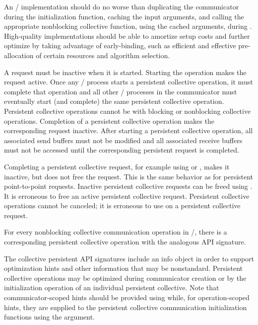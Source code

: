 \begin{implementors}
An \MPI/ implementation should do no worse than duplicating the communicator during the initialization function,
caching the input arguments, and
calling the appropriate nonblocking collective function, using the cached arguments, during .
High-quality implementations should be able to amortize setup costs and further optimize by taking advantage of early-binding,
such as efficient and effective pre-allocation of certain resources and algorithm selection.
\end{implementors}

A request must be inactive when it is started.
Starting the operation makes the request active.
%
Once any \MPI/ process starts a persistent collective operation,
it must complete that operation
and
all other \MPI/ processes in the communicator must eventually
start (and complete) the same persistent collective operation.
%
Persistent collective operations cannot be
 with blocking or nonblocking collective operations.
Completion of a persistent collective operation makes the corresponding request inactive.
%
After starting a persistent collective operation, all associated
send buffers must not be modified and all associated receive buffers
must not be accessed until the corresponding persistent request is
completed.

Completing a persistent collective request,
for example using  or ,
makes it inactive, but does not free the request.
This is the same behavior as for persistent point-to-point requests.
%
Inactive persistent collective requests
can be freed using .
It is erroneous to free an active persistent collective request.
Persistent collective operations cannot be canceled;
it is erroneous to use  on a persistent collective request.

For every nonblocking collective communication operation in \MPI/, there is
a corresponding persistent collective operation with the analogous API
signature.

The collective persistent API signatures include an info object in order to support
optimization hints and other information that may be nonstandard.
Persistent collective operations may be optimized during communicator
creation or by the initialization operation of an individual persistent collective.
%
Note that communicator-scoped hints should be provided using  while,
for operation-scoped hints, they are supplied to the persistent collective communication initialization functions
using the  argument.
%
%
%

